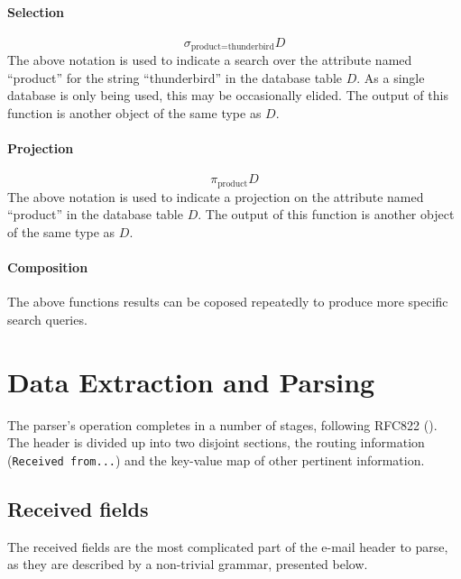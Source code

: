 \paragraph{Selection} \[\sigma_{\text{product}=\text{thunderbird}}D\]
The above notation is used to indicate a search over the attribute named
``product'' for the string ``thunderbird'' in the database table $D$.  As a
single database is only being used, this may be occasionally elided.  The output
of this function is another object of the same type as $D$.

\paragraph{Projection}
\[\pi_{\text{product}}D\]
The above notation is used to indicate a projection on the attribute named
``product'' in the database table $D$.  The output of this function is another
object of the same type as $D$.

\paragraph{Composition}
The above functions results can be coposed repeatedly to produce more specific
search queries.

\section{Data Extraction and Parsing}

The parser's operation completes in a number of stages, following RFC822
(\cite{RFC0822}).  The header is divided up into two disjoint sections, the
routing information (\texttt{Received from...}) and the key-value map of other
pertinent information.

\subsection{Received fields}

The received fields are the most complicated part of the e-mail header to parse,
as they are described by a non-trivial grammar, presented below.

